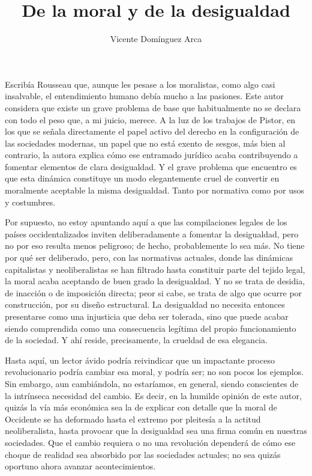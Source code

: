 \documentclass[12pt,a4paper]{article}
\title{De la moral y de la desigualdad}
\author{Vicente Domínguez Arca}
\date{}
\begin{document}
\maketitle

Escribía Rousseau que, aunque les pesase a los moralistas, como algo casi insalvable, el entendimiento humano debía mucho a las pasiones. Este autor considera que existe un grave problema de base que habitualmente no se declara con todo el peso que, a mi juicio, merece. A la luz de los trabajos de Pistor, en los que se señala directamente el papel activo del derecho en la configuración de las sociedades modernas, un papel que no está exento de sesgos, más bien al contrario, la autora explica cómo ese entramado jurídico acaba contribuyendo a fomentar elementos de clara desigualdad. Y el grave problema que encuentro es que esta dinámica constituye un modo elegantemente cruel de convertir en moralmente aceptable la misma desigualdad. Tanto por normativa como por usos y costumbres.

Por supuesto, no estoy apuntando aquí a que las compilaciones legales de los países occidentalizados inviten deliberadamente a fomentar la desigualdad, pero no por eso resulta menos peligroso; de hecho, probablemente lo sea más. No tiene por qué ser deliberado, pero, con las normativas actuales, donde las dinámicas capitalistas y neoliberalistas se han filtrado hasta constituir parte del tejido legal, la moral acaba aceptando de buen grado la desigualdad. Y no se trata de desidia, de inacción o de imposición directa; peor si cabe, se trata de algo que ocurre por construcción, por su diseño estructural. La desigualdad no necesita entonces presentarse como una injusticia que deba ser tolerada, sino que puede acabar siendo comprendida como una consecuencia legítima del propio funcionamiento de la sociedad. Y ahí reside, precisamente, la crueldad de esa elegancia.

Hasta aquí, un lector ávido podría reivindicar que un impactante proceso revolucionario podría cambiar esa moral, y podría ser; no son pocos los ejemplos. Sin embargo, aun cambiándola, no estaríamos, en general, siendo conscientes de la intrínseca necesidad del cambio. Es decir, en la humilde opinión de este autor, quizás la vía más económica sea la de explicar con detalle que la moral de Occidente se ha deformado hasta el extremo por pleitesía a la actitud neoliberalista, hasta provocar que la desigualdad sea una firma común en nuestras sociedades. Que el cambio requiera o no una revolución dependerá de cómo ese choque de realidad sea absorbido por las sociedades actuales; no sea quizás oportuno ahora avanzar acontecimientos.
\end{document}
